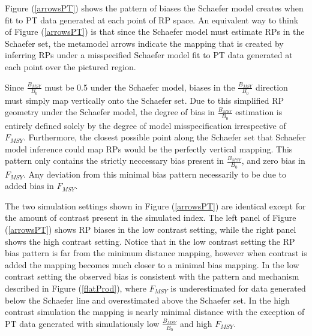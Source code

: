 \documentclass[12pt]{article}
\begin{document}
%
Figure (\ref{arrowsPT}) shows the pattern of biases the Schaefer model creates when fit 
to PT data generated at each point of RP space. An equivalent way to think of Figure 
(\ref{arrowsPT}) is that since the Schaefer model must estimate RPs in the Schaefer set, 
the metamodel arrows indicate the mapping that is created by inferring RPs under 
a misspecified Schaefer model fit to PT data generated at each point over the pictured 
region.

%
Since $\frac{B_{MSY}}{B_0}$ must be 0.5 under the Schaefer model, biases in the 
$\frac{B_{MSY}}{B_0}$ direction must simply map vertically onto the Schaefer set.
Due to this simplified RP geometry under the Schaefer model, the degree of bias in 
$\frac{B_{MSY}}{B_0}$ estimation is entirely defined solely by the degree of model 
misspecification irrespective of $F_{MSY}$. Furthermore, 
the closest possible point along the Schaefer set that Schaefer model inference %
could map RPs would be the perfectly vertical mapping. This pattern only contains the 
strictly neccessary bias present in $\frac{B_{MSY}}{B_0}$, and zero bias in $F_{MSY}$. 
Any deviation from this minimal bias pattern necessarily to be due to added bias in $F_{MSY}$.

%
The two simulation settings shown in Figure (\ref{arrowsPT}) are identical except 
for the amount of contrast present in the simulated index. The left panel of 
Figure (\ref{arrowsPT}) shows RP biases in the low contrast setting, while the 
right panel shows the high contrast setting. Notice that in the low contrast 
setting the RP bias pattern is far from the minimum distance mapping, however when 
contrast is added the mapping becomes much closer to a minimal bias mapping. 
In the low contrast setting the observed bias is consistent with the pattern 
and mechanism described in Figure (\ref{flatProd}), where $F_{MSY}$ is underestimated 
for data generated below the Schaefer line and overestimated above the Schaefer set.
In the high contrast simulation the mapping is nearly minimal distance with the exception 
of PT data generated with simulatiously low $\frac{B_{MSY}}{B_0}$ and high $F_{MSY}$. 
\end{document}

